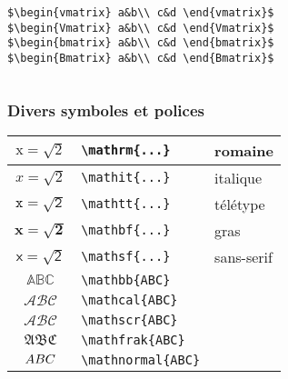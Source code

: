 \begin{frame}[containsverbatim]
\begin{columns}
        \verb|$\begin{vmatrix} a&b\\ c&d \end{vmatrix}$| \\
        \verb|$\begin{Vmatrix} a&b\\ c&d \end{Vmatrix}$| \\
        \verb|$\begin{bmatrix} a&b\\ c&d \end{bmatrix}$| \\
        \verb|$\begin{Bmatrix} a&b\\ c&d \end{Bmatrix}$| \\
    \end{columns}
\end{frame}

\begin{frame}[containsverbatim]
    \frametitle{Divers symboles et polices}
    \begin{table}
        \centering
        \begin{tabular}{|c|l|l|}
            \hline
            $\mathrm{x=\sqrt{2}}$ & \verb|\mathrm{...}|     & romaine    \\ 
            \hline
            $\mathit{x=\sqrt{2}}$ & \verb|\mathit{...}|     & italique   \\
            \hline
            $\mathtt{x=\sqrt{2}}$ & \verb|\mathtt{...}|     & télétype   \\ 
            \hline
            $\mathbf{x=\sqrt{2}}$ & \verb|\mathbf{...}|     & gras       \\
            \hline
            $\mathsf{x=\sqrt{2}}$ & \verb|\mathsf{...}|     & sans-serif \\
            \hline
            $\mathbb{ABC}$        & \verb|\mathbb{ABC}|     & \\
            \hline
            $\mathcal{ABC}$       & \verb|\mathcal{ABC}|    & \\
            \hline
            $\mathscr{ABC}$       & \verb|\mathscr{ABC}|    & \\
            \hline
            $\mathfrak{ABC}$      & \verb|\mathfrak{ABC}|   & \\
            \hline
            $\mathnormal{ABC}$    & \verb|\mathnormal{ABC}| & \\
            \hline
        \end{tabular}
    \end{table}
\end{frame}

